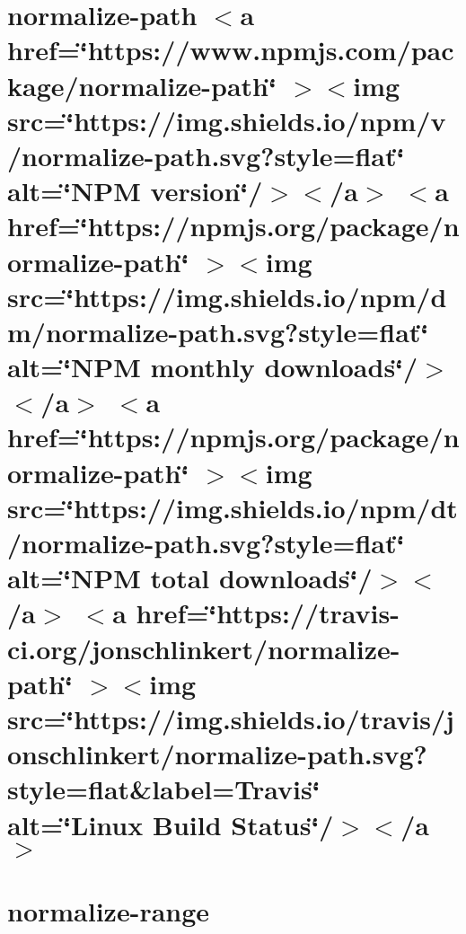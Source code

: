 \documentclass[twoside]{book}
\newcommand{\+}{\discretionary{\mbox{\scriptsize$\hookleftarrow$}}{}{}}
\begin{document}
\chapter{normalize-\/path \texorpdfstring{$<$}{<}a href=\char`\"{}https\+://www.\+npmjs.\+com/package/normalize-\/path\char`\"{} \texorpdfstring{$>$}{>}\texorpdfstring{$<$}{<}img src=\char`\"{}https\+://img.\+shields.\+io/npm/v/normalize-\/path.\+svg?style=flat\char`\"{} alt=\char`\"{}\+NPM version\char`\"{}/\texorpdfstring{$>$}{>}\texorpdfstring{$<$}{<}/a\texorpdfstring{$>$}{>} \texorpdfstring{$<$}{<}a href=\char`\"{}https\+://npmjs.\+org/package/normalize-\/path\char`\"{} \texorpdfstring{$>$}{>}\texorpdfstring{$<$}{<}img src=\char`\"{}https\+://img.\+shields.\+io/npm/dm/normalize-\/path.\+svg?style=flat\char`\"{} alt=\char`\"{}\+NPM monthly downloads\char`\"{}/\texorpdfstring{$>$}{>}\texorpdfstring{$<$}{<}/a\texorpdfstring{$>$}{>} \texorpdfstring{$<$}{<}a href=\char`\"{}https\+://npmjs.\+org/package/normalize-\/path\char`\"{} \texorpdfstring{$>$}{>}\texorpdfstring{$<$}{<}img src=\char`\"{}https\+://img.\+shields.\+io/npm/dt/normalize-\/path.\+svg?style=flat\char`\"{} alt=\char`\"{}\+NPM total downloads\char`\"{}/\texorpdfstring{$>$}{>}\texorpdfstring{$<$}{<}/a\texorpdfstring{$>$}{>} \texorpdfstring{$<$}{<}a href=\char`\"{}https\+://travis-\/ci.\+org/jonschlinkert/normalize-\/path\char`\"{} \texorpdfstring{$>$}{>}\texorpdfstring{$<$}{<}img src=\char`\"{}https\+://img.\+shields.\+io/travis/jonschlinkert/normalize-\/path.\+svg?style=flat\&label=\+Travis\char`\"{} alt=\char`\"{}\+Linux Build Status\char`\"{}/\texorpdfstring{$>$}{>}\texorpdfstring{$<$}{<}/a\texorpdfstring{$>$}{>}}
\label{md__c___users_vaishnavi_jadhav__desktop__developer_code_mean_stack_example_client_node_modules_normalize_path__r_e_a_d_m_e}

\chapter{normalize-\/range}
\label{md__c___users_vaishnavi_jadhav__desktop__developer_code_mean_stack_example_client_node_modules_normalize_range_readme}

\end{document}
